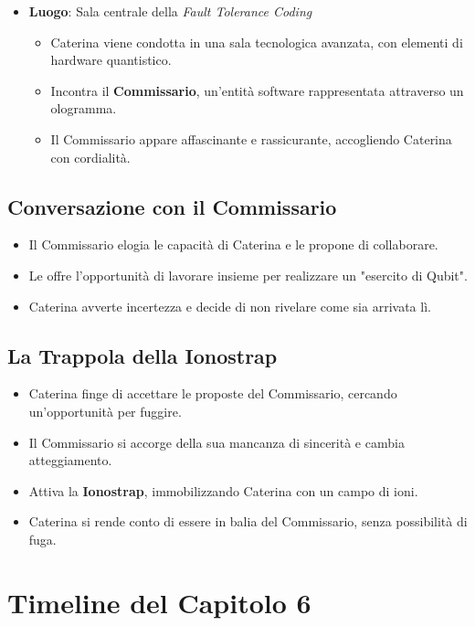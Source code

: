 \begin{itemize}
    \item \textbf{Luogo}: Sala centrale della \emph{Fault Tolerance Coding}
    \begin{itemize}
        \item Caterina viene condotta in una sala tecnologica avanzata, con elementi di hardware quantistico.
        \item Incontra il \textbf{Commissario}, un'entità software rappresentata attraverso un ologramma.
        \item Il Commissario appare affascinante e rassicurante, accogliendo Caterina con cordialità.
    \end{itemize}
\end{itemize}

\subsection*{Conversazione con il Commissario}

\begin{itemize}
    \item Il Commissario elogia le capacità di Caterina e le propone di collaborare.
    \item Le offre l'opportunità di lavorare insieme per realizzare un "esercito di Qubit".
    \item Caterina avverte incertezza e decide di non rivelare come sia arrivata lì.
\end{itemize}

\subsection*{La Trappola della Ionostrap}

\begin{itemize}
    \item Caterina finge di accettare le proposte del Commissario, cercando un'opportunità per fuggire.
    \item Il Commissario si accorge della sua mancanza di sincerità e cambia atteggiamento.
    \item Attiva la \textbf{Ionostrap}, immobilizzando Caterina con un campo di ioni.
    \item Caterina si rende conto di essere in balia del Commissario, senza possibilità di fuga.
\end{itemize}

\section*{Timeline del Capitolo 6}

